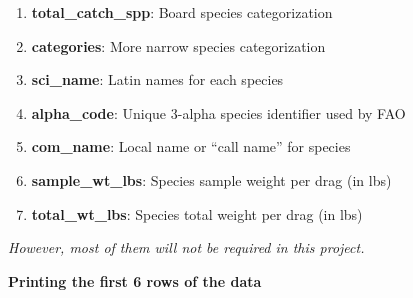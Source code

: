 \documentclass[
]{book}
\newenvironment{Shaded}{\begin{snugshade}}{\end{snugshade}}
\newcommand{\DataTypeTok}[1]{\textcolor[rgb]{0.13,0.29,0.53}{#1}}
\newcommand{\DecValTok}[1]{\textcolor[rgb]{0.00,0.00,0.81}{#1}}
\newcommand{\KeywordTok}[1]{\textcolor[rgb]{0.13,0.29,0.53}{\textbf{#1}}}
\newcommand{\NormalTok}[1]{#1}
\newcommand{\OperatorTok}[1]{\textcolor[rgb]{0.81,0.36,0.00}{\textbf{#1}}}
\newcommand{\OtherTok}[1]{\textcolor[rgb]{0.56,0.35,0.01}{#1}}
\newcommand{\StringTok}[1]{\textcolor[rgb]{0.31,0.60,0.02}{#1}}
\begin{document}
\begin{enumerate}
\item
  \textbf{total\_catch\_spp}: Board species categorization
\item
  \textbf{categories}: More narrow species categorization 
\item
  \textbf{sci\_name}: Latin names for each species
\item
  \textbf{alpha\_code}: Unique 3-alpha species identifier used by FAO
\item
  \textbf{com\_name}: Local name or ``call name'' for species
\item
  \textbf{sample\_wt\_lbs}: Species sample weight per drag (in lbs)
\item
  \textbf{total\_wt\_lbs}: Species total weight per drag (in lbs)
\end{enumerate}

\emph{However, most of them will not be required in this project.}

\textbf{Printing the first 6 rows of the data}

\begin{Shaded}
\end{Shaded}
\end{document}
